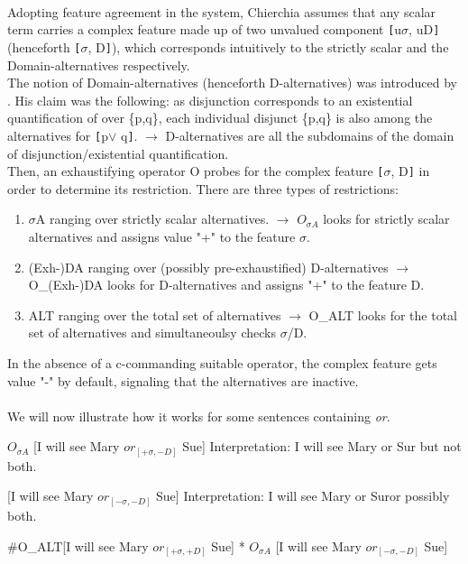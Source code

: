 \documentclass[a4paper,11pt]{article}
\begin{document}
\paragraph{}
Adopting feature agreement in the system, Chierchia assumes that any scalar term carries a complex feature made up of two unvalued component \verb![!u$\sigma$, uD\verb!]! (henceforth \verb![!$\sigma$, D\verb!]!), which corresponds intuitively to the strictly scalar and the Domain-alternatives respectively. \\The notion of Domain-alternatives  (henceforth D-alternatives) was introduced by \cite{Sau04}. 
His claim was the following: as disjunction corresponds to an existential quantification of over \{p,q\}, each individual disjunct \{p,q\} is also among the alternatives for \verb![!p$\vee$ q\verb!]!. $\rightarrow$ D-alternatives are all the subdomains of the domain of disjunction/existential quantification.
\\ Then, an exhaustifying operator O probes for the complex feature \verb![!$\sigma$, D\verb!]! in order to determine its restriction. There are three types of restrictions:

\begin{enumerate}
\item $\sigma$A ranging over strictly scalar alternatives. $\rightarrow$ $O_{\sigma A}$ looks for strictly scalar alternatives and assigns value "+" to the feature $\sigma$.
\item (Exh-)DA ranging over (possibly pre-exhaustified) D-alternatives $\rightarrow$ O_{(Exh-)DA} looks for D-alternatives and assigns "+" to the feature D.
\item ALT ranging over the total set of alternatives $\rightarrow$ O_{ALT} looks for the total set of alternatives and simultaneoulsy checks $\sigma$/D.
\end{enumerate}
In the absence of a c-commanding suitable operator, the complex feature  gets value "-" by default, signaling that the alternatives are inactive.
\paragraph{}
We will now illustrate how it works for some sentences containing \textit{or}.
\begin{exe}
\ex\label{oagree} \begin{xlist}
\ex\label{oagreea} \begin{xlist}
\ex\label{oagreeaa} $O_{\sigma A}$ [I will see Mary $or_{[+\sigma, -D]}$ Sue]
\ex\label{oagreeab} Interpretation: I will see Mary or Sur but not both.
\end{xlist}
\ex\label{oagreeb} \begin{xlist}
\ex\label{oagreeba} [I will see Mary $or_{[-\sigma, -D]}$ Sue]
\ex\label{oagreebb} Interpretation: I will see Mary or Suror possibly both.
\end{xlist}
\ex\label{oagreec} \#O_{ALT}[I will see Mary $or_{[+\sigma,+D]}$ Sue]
\ex\label{oagreed} * $O_{\sigma A}$ [I will see Mary $or_{[-\sigma, -D]}$ Sue]
\end{xlist}
\end{exe}
\end{document}
